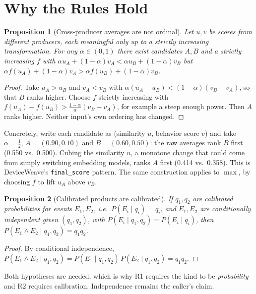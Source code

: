 \documentclass[conference]{IEEEtran}
\newtheorem{proposition}{Proposition}
\begin{document}
\section{Why the Rules Hold}
\begin{proposition}[Cross-producer averages are not ordinal]\label{prop:avg}
Let $u,v$ be scores from different producers, each meaningful only up to a strictly increasing transformation. For any $\alpha\in(0,1)$ there exist candidates $A,B$ and a strictly increasing $f$ with $\alpha u_A+(1-\alpha)v_A<\alpha u_B+(1-\alpha)v_B$ but $\alpha f(u_A)+(1-\alpha)v_A>\alpha f(u_B)+(1-\alpha)v_B$.
\end{proposition}
\begin{proof}
Take $u_A>u_B$ and $v_A<v_B$ with $\alpha(u_A-u_B)<(1-\alpha)(v_B-v_A)$, so that $B$ ranks higher. Choose $f$ strictly increasing with $f(u_A)-f(u_B)>\frac{1-\alpha}{\alpha}(v_B-v_A)$, for example a steep enough power. Then $A$ ranks higher. Neither input's own ordering has changed.
\end{proof}
Concretely, write each candidate as (similarity $u$, behavior score $v$) and take $\alpha=\tfrac12$, $A=(0.90,0.10)$ and $B=(0.60,0.50)$: the raw averages rank $B$ first (0.550 vs.\ 0.500). Cubing the similarity $u$, a monotone change that could come from simply switching embedding models, ranks $A$ first (0.414 vs.\ 0.358). This is DeviceWeave's \texttt{final\_score} pattern. The same construction applies to $\max$, by choosing $f$ to lift $u_A$ above $v_B$.

\begin{proposition}[Calibrated products are calibrated]\label{prop:prod}
If $q_1,q_2$ are calibrated probabilities for events $E_1,E_2$, i.e.\ $P(E_i\mid q_i)=q_i$, and $E_1,E_2$ are conditionally independent given $(q_1,q_2)$, with $P(E_i\mid q_1,q_2)=P(E_i\mid q_i)$, then $P(E_1\wedge E_2\mid q_1,q_2)=q_1q_2$.
\end{proposition}
\begin{proof}
By conditional independence, $P(E_1\wedge E_2\mid q_1,q_2)=P(E_1\mid q_1,q_2)\,P(E_2\mid q_1,q_2)=q_1q_2$.
\end{proof}
Both hypotheses are needed, which is why R1 requires the kind to be \emph{probability} and R2 requires calibration. Independence remains the caller's claim.
\end{document}
